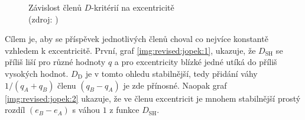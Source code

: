 \begin{figure}[ht]
    \centering
    \hfill
    \caption[Závislost členů $D$-kritérií na excentricitě]{
        Závislost členů $D$-kritérií na excentricitě\\
        {\small (zdroj: \cite{remarks})}
    }
    \label{img:revised:jopek}
\end{figure}

Cílem je, aby se příspěvek jednotlivých členů choval co nejvíce konstantě vzhledem k excentricitě. První, graf \ref{img:revised:jopek:1}, ukazuje, že $D_\text{SH}$ se příliš liší pro různé hodnoty $q$ a pro excentricity blízké jedné utíká do příliš vysokých hodnot. $D_\text{D}$ je v tomto ohledu stabilnější, tedy přidání váhy $1/(q_A+q_B)$ členu $(q_B-q_A)$ je zde přínosné. Naopak graf \ref{img:revised:jopek:2} ukazuje, že ve členu excentricit je mnohem stabilnější prostý rozdíl $(e_B-e_A)$ s váhou $1$ z funkce $D_\text{SH}$.

\medskip

